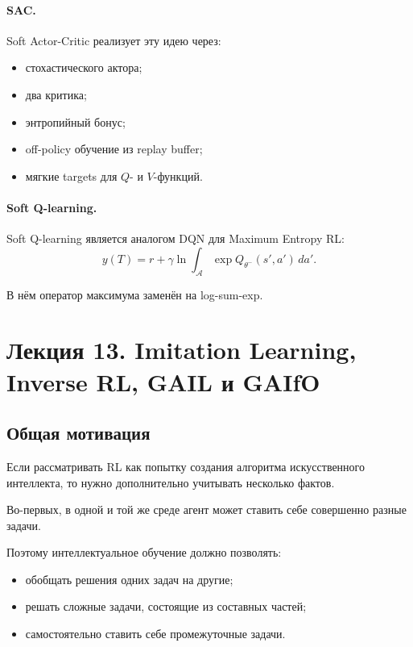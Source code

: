 \documentclass[12pt,a4paper]{article}
\begin{document}
\paragraph{SAC.}

Soft Actor-Critic реализует эту идею через:
\begin{itemize}
    \item стохастического актора;
    \item два критика;
    \item энтропийный бонус;
    \item off-policy обучение из replay buffer;
    \item мягкие targets для $Q$- и $V$-функций.
\end{itemize}

\paragraph{Soft Q-learning.}

Soft Q-learning является аналогом DQN для Maximum Entropy RL:
\[
y(T)
=
r
+
\gamma
\ln
\int_{\mathcal A}
\exp Q_{\theta^-}(s',a')
\,da'.
\]

В нём оператор максимума заменён на log-sum-exp.




\section{Лекция 13. Imitation Learning, Inverse RL, GAIL и GAIfO}

\subsection{Общая мотивация}

Если рассматривать RL как попытку создания алгоритма искусственного интеллекта, то нужно дополнительно учитывать несколько фактов.

Во-первых, в одной и той же среде агент может ставить себе совершенно разные задачи.

Поэтому интеллектуальное обучение должно позволять:
\begin{itemize}
    \item обобщать решения одних задач на другие;
    \item решать сложные задачи, состоящие из составных частей;
    \item самостоятельно ставить себе промежуточные задачи.
\end{itemize}
\end{document}
